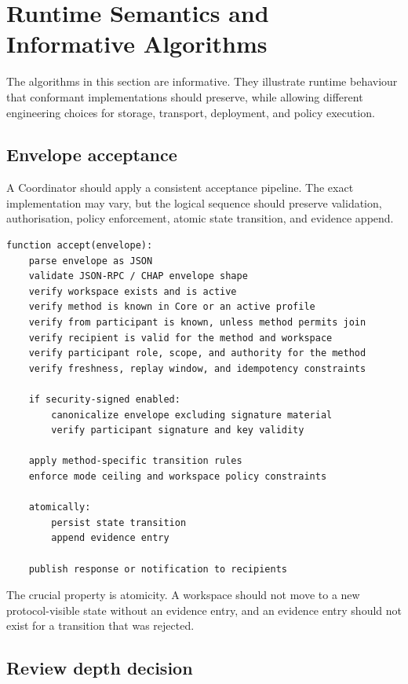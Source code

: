 \documentclass[11pt]{article}
\begin{document}
\section{Runtime Semantics and Informative Algorithms}
\label{sec:runtime-semantics}

The algorithms in this section are informative. They illustrate runtime behaviour that conformant implementations should preserve, while allowing different engineering choices for storage, transport, deployment, and policy execution.

\subsection{Envelope acceptance}

A Coordinator should apply a consistent acceptance pipeline. The exact implementation may vary, but the logical sequence should preserve validation, authorisation, policy enforcement, atomic state transition, and evidence append.

\begin{lstlisting}[caption={Coordinator acceptance pipeline, informative pseudocode.},label={lst:acceptance}]
function accept(envelope):
    parse envelope as JSON
    validate JSON-RPC / CHAP envelope shape
    verify workspace exists and is active
    verify method is known in Core or an active profile
    verify from participant is known, unless method permits join
    verify recipient is valid for the method and workspace
    verify participant role, scope, and authority for the method
    verify freshness, replay window, and idempotency constraints

    if security-signed enabled:
        canonicalize envelope excluding signature material
        verify participant signature and key validity

    apply method-specific transition rules
    enforce mode ceiling and workspace policy constraints

    atomically:
        persist state transition
        append evidence entry

    publish response or notification to recipients
\end{lstlisting}

The crucial property is atomicity. A workspace should not move to a new protocol-visible state without an evidence entry, and an evidence entry should not exist for a transition that was rejected.

\subsection{Review depth decision}
\end{document}
